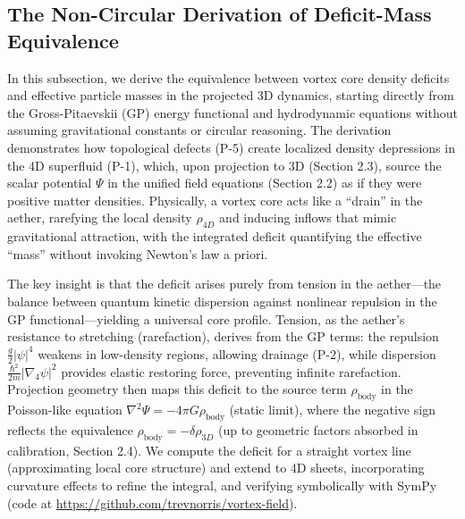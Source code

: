 
\subsection{The Non-Circular Derivation of Deficit-Mass Equivalence}

In this subsection, we derive the equivalence between vortex core density deficits and effective particle masses in the projected 3D dynamics, starting directly from the Gross-Pitaevskii (GP) energy functional and hydrodynamic equations without assuming gravitational constants or circular reasoning. The derivation demonstrates how topological defects (P-5) create localized density depressions in the 4D superfluid (P-1), which, upon projection to 3D (Section 2.3), source the scalar potential $\Psi$ in the unified field equations (Section 2.2) as if they were positive matter densities. Physically, a vortex core acts like a ``drain'' in the aether, rarefying the local density $\rho_{4D}$ and inducing inflows that mimic gravitational attraction, with the integrated deficit quantifying the effective ``mass'' without invoking Newton's law a priori.

The key insight is that the deficit arises purely from tension in the aether---the balance between quantum kinetic dispersion against nonlinear repulsion in the GP functional---yielding a universal core profile. Tension, as the aether's resistance to stretching (rarefaction), derives from the GP terms: the repulsion $\frac{g}{2} |\psi|^4$ weakens in low-density regions, allowing drainage (P-2), while dispersion $\frac{\hbar^2}{2m} |\nabla_4 \psi|^2$ provides elastic restoring force, preventing infinite rarefaction. Projection geometry then maps this deficit to the source term $\rho_{\text{body}}$ in the Poisson-like equation $\nabla^2 \Psi = -4\pi G \rho_{\text{body}}$ (static limit), where the negative sign reflects the equivalence $\rho_{\text{body}} = - \delta \rho_{3D}$ (up to geometric factors absorbed in calibration, Section 2.4). We compute the deficit for a straight vortex line (approximating local core structure) and extend to 4D sheets, incorporating curvature effects to refine the integral, and verifying symbolically with SymPy (code at \url{https://github.com/trevnorris/vortex-field}).

